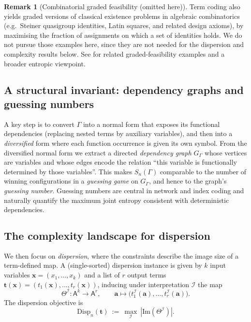 \documentclass[11pt]{article}
\newcommand{\parencite}[1]{\citep{#1}}
\theoremstyle{definition}
\newtheorem{remark}{Remark}[section]
\theoremstyle{plain}
\newcommand{\A}{\mathsf{A}}
\newcommand{\Img}{\mathrm{Im}}
\newcommand{\Disp}{\mathrm{Disp}}
\newcommand{\Sn}{S_n}
\begin{document}
\begin{remark}[Combinatorial graded feasibility (omitted here)]
Term coding also yields graded versions of classical existence problems in algebraic combinatorics
(e.g.\ Steiner quasigroup identities, Latin squares, and related design axioms), by maximising the fraction of
assignments on which a set of identities holds.
We do not pursue those examples here, since they are not needed for the dispersion and complexity results below.
See \parencite{riis2026termcoding} for related graded-feasibility examples and a broader entropic viewpoint.
\end{remark}

\subsection{A structural invariant: dependency graphs and guessing numbers}
A key step is to convert $\Gamma$ into a normal form that exposes its functional dependencies
(replacing nested terms by auxiliary variables), and then into a \emph{diversified} form where each
function occurrence is given its own symbol.
From the diversified normal form we extract a directed \emph{dependency graph}
$G_\Gamma$ whose vertices are variables and whose edges encode the relation ``this variable is functionally determined by
those variables''.
This makes $\Sn(\Gamma)$ comparable to the number of winning configurations in a \emph{guessing game} on
$G_\Gamma$, and hence to the graph's \emph{guessing number}.
Guessing numbers are central in network and index coding
\parencite{riis2006information,riis2007graph,gadouleau2011graph} and naturally quantify the maximum joint entropy
consistent with deterministic dependencies.

\subsection{The complexity landscape for dispersion}
We then focus on \emph{dispersion}, where the constraints describe the image size of a term-defined map.
A (single-sorted) dispersion instance is given by $k$ input variables
$\mathbf x=(x_1,\dots,x_k)$ and a list of $r$ output terms
$\mathbf t(\mathbf x)=(t_1(\mathbf x),\dots,t_r(\mathbf x))$, inducing under interpretation $\mathcal I$ the map
\[
\Theta^\mathcal I:\A^k\to \A^r,\qquad
\mathbf a\mapsto \bigl(t_1^\mathcal I(\mathbf a),\dots,t_r^\mathcal I(\mathbf a)\bigr).
\]
The dispersion objective is
\[
\Disp_n(\mathbf t)\ :=\ \max_{\mathcal I}\ |\Img(\Theta^\mathcal I)|.
\]
\end{document}
